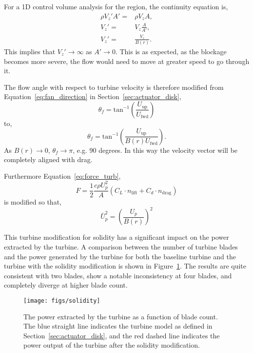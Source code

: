 For a 1D control volume analysis for the region, the continuity
equation is, 
\begin{eqnarray}
 \rho V_z' A' =& \rho V_z A,\\
 V_z' =& V_z \frac{A}{A'}, \\
 V_z' =& \frac{V_z}{B(r)}.
\end{eqnarray}
This implies that $V_z' \rightarrow \infty$ as $A' \rightarrow
0$. This is as expected, as the blockage becomes more severe, the flow
would need to move at greater speed to go through it. 

The flow angle with respect to turbine velocity is therefore modified 
from Equation~\ref{eq:fan_direction} in
Section~\ref{sec:actuator_disk},
\begin{equation}
 \theta_f = \text{tan}^{-1}(\frac{U_{\text{up}}}{U_{\text{fwd}}})
\end{equation}
to,
\begin{equation}
 \theta_f = \text{tan}^{-1}(\frac{U_{\text{up}}}{B(r) U_{\text{fwd}}}). 
\end{equation}
As $B(r) \rightarrow 0$, $\theta_f \rightarrow \pi$, e.g. 90 degrees. In
this way the velocity vector will be completely aligned with drag. 

Furthermore Equation~\ref{eq:force_turb}, 
\begin{equation}
 F = \frac{1}{2}\frac{c \rho U_p^2}{A}(C_L \cdot n_{\text{lift}} + C_d
  \cdot n_{\text{drag}})
\end{equation}
is modified so that, 
\begin{equation}
 \bar U_p^{2} = \left(\frac{U_p}{B(r)}\right)^2
\end{equation}

This turbine modification for solidity has a significant impact on the
power extracted by the turbine. A comparison between the number of
turbine blades and the power generated by the turbine for both the
baseline turbine and the turbine with the solidity modification is shown in
Figure~\ref{fig:turbine_solidity}. The results are quite consistent with
two blades, show a notable inconsistency at four blades, and completely
diverge at higher blade count. 

  \begin{figure}[!htb]
   \begin{center}
    \texttt{[image: figs/solidity]}
    \caption{The power extracted by the turbine as a function of blade
    count. The blue straight line indicates the turbine model as defined
    in Section~\ref{sec:actuator_disk}, and the red dashed line
    indicates the power output of the turbine after the solidity
    modification.}
    \label{fig:turbine_solidity}
   \end{center}
  \end{figure}

